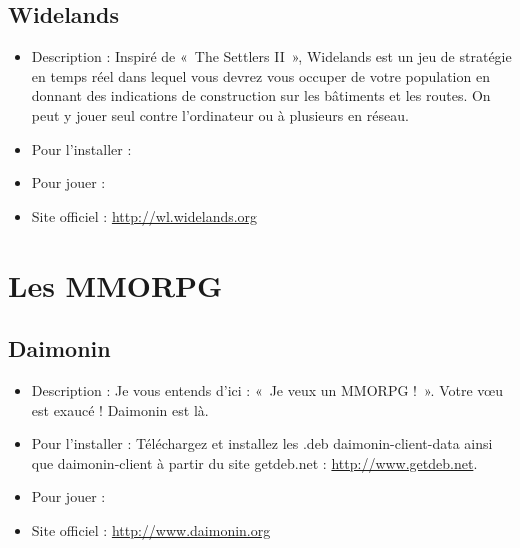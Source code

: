 \subsection{Widelands}
\begin{itemize}
\begingroup
{}
\item Description : Inspiré de «~The Settlers II~», Widelands est un jeu de stratégie en temps réel dans lequel vous devrez vous occuper de votre population en donnant des indications de construction sur les bâtiments et les routes. On peut y jouer seul contre l'ordinateur ou à plusieurs en réseau.{\par}
\item Pour l'installer : 
\item Pour jouer : 
\item Site officiel : \url{http://wl.widelands.org}{\par}
\endgroup
\end{itemize}
\section{Les MMORPG}
\subsection{Daimonin}
\begin{itemize}
\begingroup
{}
\item Description : Je vous entends d'ici : «~Je veux un MMORPG !~». Votre vœu est exaucé ! Daimonin est là.{\par}
\item Pour l'installer : Téléchargez et installez les .deb daimonin-client-data ainsi que daimonin-client à partir du site getdeb.net : \url{http://www.getdeb.net}.{\par}
\endgroup
\item Pour jouer : 
\item Site officiel : \url{http://www.daimonin.org}{\par}
\end{itemize}
